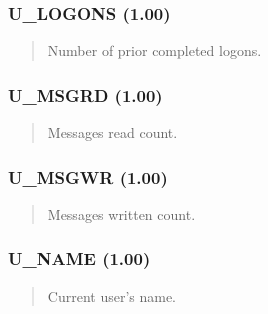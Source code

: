 \documentclass[letterpaper,10pt,english]{sphinxmanual}
\begin{document}
\subsubsection{U\_LOGONS (1.00)}
\label{\detokenize{ppl:u-logons-1-00}}\begin{quote}

\sphinxAtStartPar
{}
\begin{description}
\sphinxAtStartPar
Number of prior completed logons.

\end{description}
\end{quote}


\subsubsection{U\_MSGRD (1.00)}
\label{\detokenize{ppl:u-msgrd-1-00}}\begin{quote}

\sphinxAtStartPar
{}
\begin{description}
\sphinxAtStartPar
Messages read count.

\end{description}
\end{quote}


\subsubsection{U\_MSGWR (1.00)}
\label{\detokenize{ppl:u-msgwr-1-00}}\begin{quote}

\sphinxAtStartPar
{}
\begin{description}
\sphinxAtStartPar
Messages written count.

\end{description}
\end{quote}


\subsubsection{U\_NAME (1.00)}
\label{\detokenize{ppl:u-name-1-00}}\begin{quote}

\sphinxAtStartPar
{}
\begin{description}
\sphinxAtStartPar
Current user’s name.

\end{description}
\end{quote}
\end{document}
